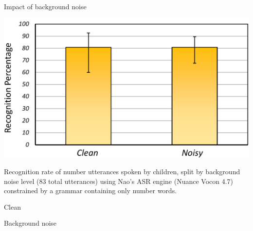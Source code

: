 \documentclass[compress]{beamer}
\begin{document}
\begin{frame}{Impact of background noise}

\begin{center}
    \includegraphics[width=0.8\linewidth]{noise_graph}
\end{center}

Recognition rate of number utterances spoken by children, split by
background noise level (83 total utterances) using Nao's ASR engine
(Nuance Vocon 4.7) constrained by a grammar containing only number
words.

Clean

Background noise

\end{frame}
\end{document}
